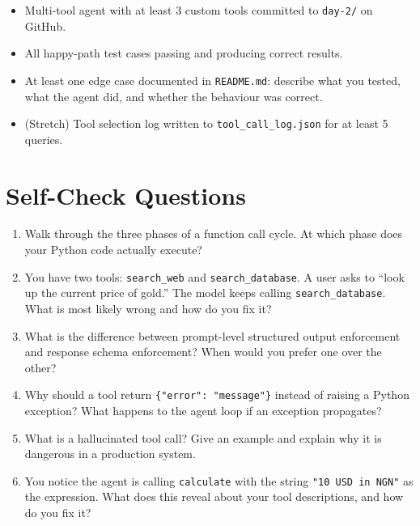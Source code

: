 \documentclass[12pt, a4paper]{article}
\begin{document}
\begin{delivbox}
\begin{itemize}[leftmargin=*, itemsep=3pt]
  \item Multi-tool agent with at least 3 custom tools committed to \texttt{day-2/} on GitHub.
  \item All happy-path test cases passing and producing correct results.
  \item At least one edge case documented in \texttt{README.md}: describe what you tested, what the agent did, and whether the behaviour was correct.
  \item (Stretch) Tool selection log written to \texttt{tool\_call\_log.json} for at least 5 queries.
\end{itemize}
\end{delivbox}

\vspace{1.5em}

\section{Self-Check Questions}

\begin{enumerate}[leftmargin=*, label=\textbf{Q\arabic*.}, itemsep=6pt]
  \item Walk through the three phases of a function call cycle. At which phase does your Python code actually execute?
  \item You have two tools: \texttt{search\_web} and \texttt{search\_database}. A user asks to ``look up the current price of gold.'' The model keeps calling \texttt{search\_database}. What is most likely wrong and how do you fix it?
  \item What is the difference between prompt-level structured output enforcement and response schema enforcement? When would you prefer one over the other?
  \item Why should a tool return \texttt{\{"error": "message"\}} instead of raising a Python exception? What happens to the agent loop if an exception propagates?
  \item What is a hallucinated tool call? Give an example and explain why it is dangerous in a production system.
  \item You notice the agent is calling \texttt{calculate} with the string \texttt{"10 USD in NGN"} as the expression. What does this reveal about your tool descriptions, and how do you fix it?
\end{enumerate}
\end{document}
